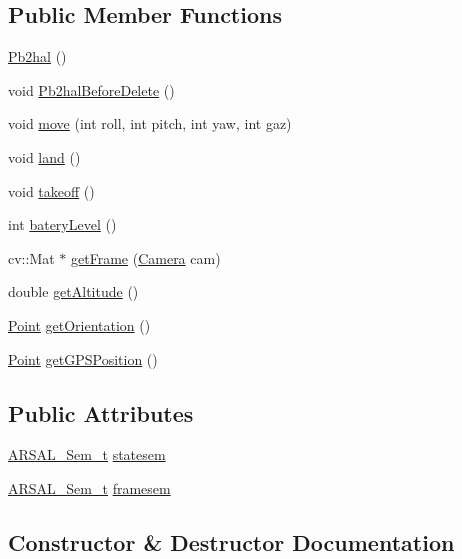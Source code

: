 \subsection*{Public Member Functions}
\begin{DoxyCompactItemize}
\item 
\hyperlink{class_pb2hal_a4c09c3d9d4f002f09fa98623e83a7f4b}{Pb2hal} ()
\item 
void \hyperlink{class_pb2hal_a36a07430014895e34285e12881e4193b}{Pb2hal\+Before\+Delete} ()
\item 
void \hyperlink{class_pb2hal_a0caa1d537df7054f823a092c208de12e}{move} (int roll, int pitch, int yaw, int gaz)
\item 
void \hyperlink{class_pb2hal_a139f305d3ba6d3a8736914420128895c}{land} ()
\item 
void \hyperlink{class_pb2hal_a87834a3d1b4142c6d98e2dd93f4c3ffb}{takeoff} ()
\item 
int \hyperlink{class_pb2hal_a9504b93ebff1164367949aecbfd9c2ef}{batery\+Level} ()
\item 
cv\+::\+Mat $\ast$ \hyperlink{class_pb2hal_afd9dcf01b317140ca3fc58d2d3907ab9}{get\+Frame} (\hyperlink{hal_8hpp_adc0591c2c6aa3aa864336ece4978ab62}{Camera} cam)
\item 
double \hyperlink{class_pb2hal_a212b719d8a394edfd9d92020ede194ec}{get\+Altitude} ()
\item 
\hyperlink{struct_point}{Point} \hyperlink{class_pb2hal_a3dc0b2dc30a97f396d8a8525442a52e3}{get\+Orientation} ()
\item 
\hyperlink{struct_point}{Point} \hyperlink{class_pb2hal_a010064c234eddf22ebcdb25d2c9864e7}{get\+G\+P\+S\+Position} ()
\end{DoxyCompactItemize}
\subsection*{Public Attributes}
\begin{DoxyCompactItemize}
\item 
\hyperlink{_a_r_s_a_l___sem_8h_a74eaf25f9acaab7ff185cb3c30ffda1c}{A\+R\+S\+A\+L\+\_\+\+Sem\+\_\+t} \hyperlink{class_pb2hal_a11de30f365a04e339850b742309f3b8f}{statesem}
\item 
\hyperlink{_a_r_s_a_l___sem_8h_a74eaf25f9acaab7ff185cb3c30ffda1c}{A\+R\+S\+A\+L\+\_\+\+Sem\+\_\+t} \hyperlink{class_pb2hal_a50c2bf8f1c963e9765f997f9cb7e137c}{framesem}
\end{DoxyCompactItemize}


\subsection{Constructor \& Destructor Documentation}
